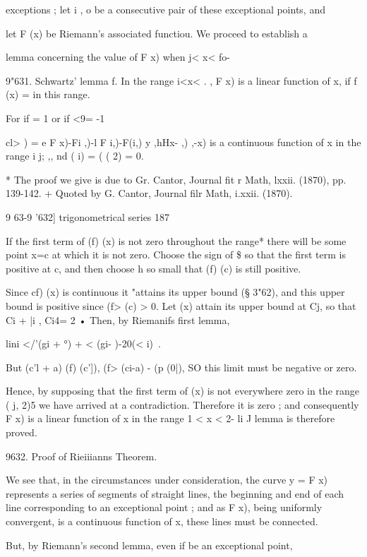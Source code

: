 {exceptions ; let  i ,  o be a consecutive pair of these exceptional points, and 

let F (x) be Riemann's associated functiou. We proceed to establish a 

lemma concerning the value of F x) when  j< x< fo- 

9"631. Schwartz' lemma f. In the range  i<x< . , F x) is a linear function of x, 
if f (x) = in this range. 

For if   = 1 or if <9= -1 

cl>  ) = e F x)-Fi ,)-l  F i,)-F(i,) y ,hHx- ,)  ,-x) 
is a continuous function of x in the range  i  j;   ,,  nd ( i) = (  ( 2) = 0. 

* The proof we give is due to Gr. Cantor, Journal fit r Math, lxxii. (1870), pp. 139-142. 
+ Quoted by G. Cantor, Journal filr Math, i.xxii. (1870). 



9 63-9 '632] trigonometrical series 187 

If the first term of (f) (x) is not zero throughout the range* there will be some point 
x=c at which it is not zero. Choose the sign of \$ so that the first term is positive at c, 
and then choose h so small that (f) (c) is still positive. 

Since cf) (x) is continuous it "attains its upper bound (§ 3"62), and this upper bound is 
positive since (f> (c) > 0. Let (x) attain its upper bound at Cj, so that Ci + |i , Ci4= 2 • 
Then, by Riemanifs first lemma, 

lini </'(gi + °) + < (gi- )-20(<  i)\  . 

But (c'l + a)   (f) (c']), (f> (ci-a) - (p (0|), SO this limit must be negative or zero. 

Hence, by supposing that the first term of (x) is not everywhere zero in the range 
( j,  2)5 we have arrived at a contradiction. Therefore it is zero ; and consequently F x) is 
a linear function of x in the range  1 < x <  2-   li J lemma is therefore proved. 

9632. Proof of Rieiiianns Theorem. 

We see that, in the circumstances under consideration, the curve y = F  x) 
represents a series of segments of straight lines, the beginning and end of 
each line corresponding to an exceptional point ; and as F x), being uniformly 
convergent, is a continuous function of x, these lines must be connected. 

But, by Riemann's second lemma, even if   be an exceptional point, 

}
